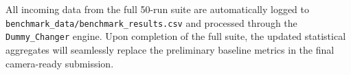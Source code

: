\documentclass{svproc}
\begin{document}
All incoming data from the full 50-run suite are automatically logged to \texttt{benchmark\_data/benchmark\_results.csv} and processed through the \texttt{Dummy\_Changer} engine. Upon completion of the full suite, the updated statistical aggregates will seamlessly replace the preliminary baseline metrics in the final camera-ready submission.
\end{document}
